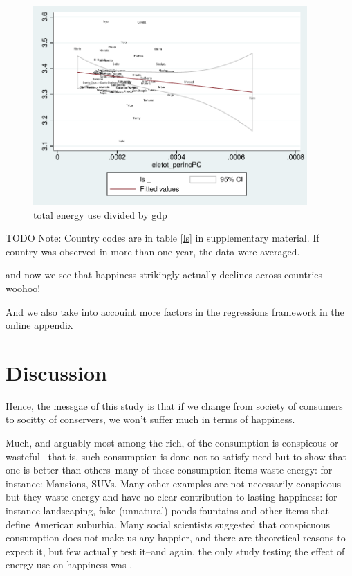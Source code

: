 \documentclass[10pt, letterpaper]{article}
\begin{document}
\begin{spacing}{1.4}
\begin{figure}[H]
 \includegraphics[height=3in]{graphsAndTables/caEleTotGdp.pdf}\centering
\caption{total energy use divided by gdp}\label{}
\end{figure}
{\scriptsize TODO Note: Country codes are in table \ref{ls} in supplementary
  material. If country was observed in more than one year, the data were averaged.}



and now we see that happiness strikingly actually declines across countries woohoo!

And we also take into accouint more factors in the regressions framework in the
online appendix

\section{Discussion}


Hence, the messgae of this study is that if we change from society of consumers
to socitty of conservers, we won't suffer much in terms of happiness.

Much, and  arguably most among the rich, of the consumption is conspicous or
wasteful \citep{veblen05a, veblen05b}--that is, such consumption is done not to satisfy need but to show that
one is better than others--many of these consumption items waste energy: for
instance: Mansions, SUVs.  Many other examples are not necessarily conspicous
but they waste energy and have no clear contribution to lasting happiness: for
instance landscaping, fake (unnatural) ponds fountains and other items that
define American suburbia. Many social scientists \citep[e.g.][]{csikszentmihalyi99, frank04, frank05, frank12} suggested that conspicuous consumption
does not make us any happier, and there are theoretical reasons to
expect it, but few actually test it--and again, the only  study testing the
effect of energy use on happiness was \citet{graef81}.


\end{spacing}
\end{document}
